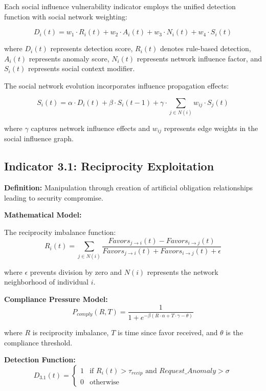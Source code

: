 \documentclass[11pt,a4paper]{article}
\begin{document}
Each social influence vulnerability indicator employs the unified detection function with social network weighting:

\begin{equation}
D_i(t) = w_1 \cdot R_i(t) + w_2 \cdot A_i(t) + w_3 \cdot N_i(t) + w_4 \cdot S_i(t)
\end{equation}

where $D_i(t)$ represents detection score, $R_i(t)$ denotes rule-based detection, $A_i(t)$ represents anomaly score, $N_i(t)$ represents network influence factor, and $S_i(t)$ represents social context modifier.

The social network evolution incorporates influence propagation effects:

\begin{equation}
S_i(t) = \alpha \cdot D_i(t) + \beta \cdot S_i(t-1) + \gamma \cdot \sum_{j \in N(i)} w_{ij} \cdot S_j(t)
\end{equation}

where $\gamma$ captures network influence effects and $w_{ij}$ represents edge weights in the social influence graph.

\subsection{Indicator 3.1: Reciprocity Exploitation}

\textbf{Definition:} Manipulation through creation of artificial obligation relationships leading to security compromise.

\textbf{Mathematical Model:}

The reciprocity imbalance function:
\begin{equation}
R_i(t) = \sum_{j \in N(i)} \frac{Favors_{j \to i}(t) - Favors_{i \to j}(t)}{Favors_{j \to i}(t) + Favors_{i \to j}(t) + \epsilon}
\end{equation}

where $\epsilon$ prevents division by zero and $N(i)$ represents the network neighborhood of individual $i$.

\textbf{Compliance Pressure Model:}
\begin{equation}
P_{comply}(R,T) = \frac{1}{1 + e^{-\beta(R \cdot \alpha + T \cdot \gamma - \theta)}}
\end{equation}

where $R$ is reciprocity imbalance, $T$ is time since favor received, and $\theta$ is the compliance threshold.

\textbf{Detection Function:}
\begin{equation}
D_{3.1}(t) = \begin{cases}
1 & \text{if } R_i(t) > \tau_{recip} \text{ and } Request\_Anomaly > \sigma \\
0 & \text{otherwise}
\end{cases}
\end{equation}
\end{document}
